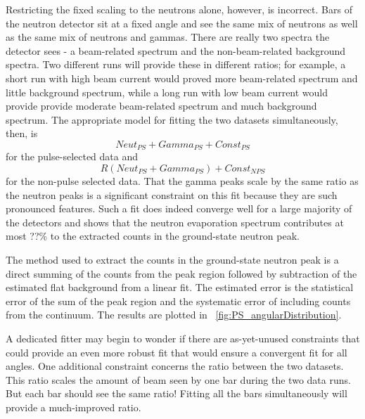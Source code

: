 Restricting the fixed scaling to the neutrons alone, however, is incorrect.  Bars of the neutron detector sit at a fixed angle and see the same mix of neutrons as well as the same mix of neutrons and gammas.  There are really two spectra the detector sees - a beam-related spectrum and the non-beam-related background spectra.  Two different runs will provide these in different ratios; for example, a short run with high beam current would proved more beam-related spectrum and little background spectrum, while a long run with low beam current would provide provide moderate beam-related spectrum and much background spectrum.  The appropriate model for fitting the two datasets simultaneously, then, is
\begin{equation}
Neut_{PS} + Gamma_{PS} + Const_{PS}
\end{equation}
for the pulse-selected data and 
\begin{equation}
R(Neut_{PS} + Gamma_{PS}) + Const_{NPS}
\end{equation}
for the non-pulse selected data.  That the gamma peaks scale by the same ratio as the neutron peaks is a significant constraint on this fit because they are such pronounced features.  Such a fit does indeed converge well for a large majority of the detectors and shows that the neutron evaporation spectrum contributes at most ??\% to the extracted counts in the ground-state neutron peak.  

The method used to extract the counts in the ground-state neutron peak is a direct summing of the counts from the peak region followed by subtraction of the estimated flat background from a linear fit.  The estimated error is the statistical error of the sum of the peak region and the systematic error of including counts from the continuum.  The results are plotted in {\fig}~\ref{fig:PS_angularDistribution}.

A dedicated fitter may begin to wonder if there are as-yet-unused constraints that could provide an even more robust fit that would ensure a convergent fit for all angles.  One additional constraint concerns the ratio between the two datasets.  This ratio scales the amount of beam seen by one bar during the two data runs.  But each bar should see the same ratio!  Fitting all the bars simultaneously will provide a much-improved ratio.


